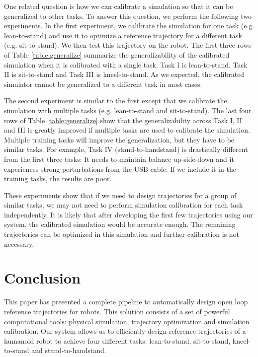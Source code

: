 One related question is how we can calibrate a simulation so that it can be generalized to other tasks. To answer this question, we perform the following two experiments. In the first experiment, we calibrate the simulation for one task (e.g. lean-to-stand) and use it to optimize a reference trajectory for a different task (e.g. sit-to-stand). We then test this trajectory on the robot. The first three rows of Table \ref{table:generalize} summarize the generalizability of the calibrated simulation when it is calibrated with a single task. Task I is lean-to-stand. Task II is sit-to-stand and Task III is kneel-to-stand. As we expected, the calibrated simulator cannot be generalized to a different task in most cases.

The second experiment is similar to the first except that we calibrate the simulation with multiple tasks (e.g. lean-to-stand and sit-to-stand). The last four rows of Table \ref{table:generalize} show that the generalizability across Task I, II and III is greatly improved if multiple tasks are used to calibrate the simulation. Multiple training tasks will improve the generalization, but they have to be similar tasks. For example, Task IV (stand-to-handstand) is drastically different from the first three tasks: It needs to maintain balance up-side-down and it experiences strong perturbations from the USB cable. If we include it in the training tasks, the results are poor.

These experiments show that if we need to design trajectories for a group of similar tasks, we may not need to perform simulation calibration for each task independently. It is likely that after developing the first few trajectories using our system, the calibrated simulation would be accurate enough. The remaining trajectories can be optimized in this simulation and further calibration is not necessary.

\section{Conclusion}

This paper has presented a complete pipeline to automatically design open loop reference trajectories for robots. This solution consists of a set of powerful computational tools: physical simulation, trajectory optimization and simulation calibration. Our system allows us to efficiently design reference trajectories of a humanoid robot to achieve four different tasks: lean-to-stand, sit-to-stand, kneel-to-stand and stand-to-handstand.


